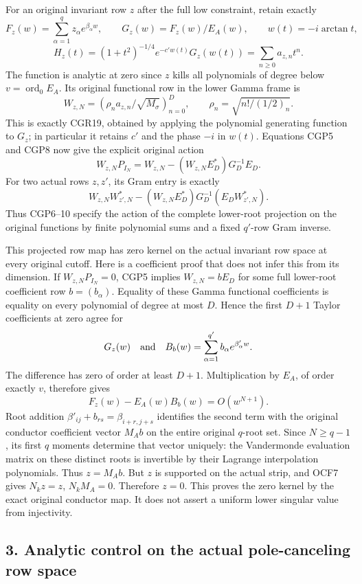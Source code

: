 For an original invariant row \(z\) after the full low constraint, retain exactly \[
F_z(w)=\sum_{\alpha=1}^{q}z_\alpha e^{\beta_\alpha w},\qquad
G_z(w)=F_z(w)/E_A(w),\qquad
w(t)=-i\arctan t,
\] \[
H_z(t)=(1+t^2)^{-1/4}e^{-c'w(t)}G_z(w(t))
=\sum_{n\ge0}a_{z,n}t^n.
\tag{CGP7}
\] The function is analytic at zero since \(z\) kills all polynomials of degree below \(v=\operatorname{ord}_0E_A\). Its original functional row in the lower Gamma frame is \[
W_{z,N}=(\rho_na_{z,n}/\sqrt{M_\sigma})_{n=0}^D,
\qquad \rho_n=\sqrt{n!/(1/2)_n}.
\tag{CGP8}
\] This is exactly CGR19, obtained by applying the polynomial generating function to \(G_z\); in particular it retains \(c'\) and the phase \(-i\) in \(w(t)\). Equations CGP5 and CGP8 now give the explicit original action \[
\boxed{W_{z,N}P_{I_N}
=W_{z,N}-(W_{z,N}E_D^*)G_D^{-1}E_D.}
\tag{CGP9}
\] For two actual rows \(z,z'\), its Gram entry is exactly \[
W_{z,N}W_{z',N}^*
-(W_{z,N}E_D^*)G_D^{-1}(E_DW_{z',N}^*).
\tag{CGP10}
\] Thus CGP6--10 specify the action of the complete lower-root projection on the original functions by finite polynomial sums and a fixed \(q'\)-row Gram inverse.

This projected row map has zero kernel on the actual invariant row space at every original cutoff. Here is a coefficient proof that does not infer this from its dimension. If \(W_{z,N}P_{I_N}=0\), CGP5 implies \(W_{z,N}=bE_D\) for some full lower-root coefficient row \(b=(b_\alpha)\). Equality of these Gamma functional coefficients is equality on every polynomial of degree at most \(D\). Hence the first \(D+1\) Taylor coefficients at zero agree for \[
G_z(w)\quad\hbox{and}\quad B_b(w)=\sum_{\alpha=1}^{q'}
b_\alpha e^{\beta'_\alpha w}.
\] The difference has zero of order at least \(D+1\). Multiplication by \(E_A\), of order exactly \(v\), therefore gives \[
F_z(w)-E_A(w)B_b(w)=O(w^{N+1}).
\tag{CGP11}
\] Root addition \(\beta'_{ij}+b_{rs}=\beta_{i+r,j+s}\) identifies the second term with the original conductor coefficient vector \(M_Ab\) on the entire original \(q\)-root set. Since \(N\ge q-1\), its first \(q\) moments determine that vector uniquely: the Vandermonde evaluation matrix on these distinct roots is invertible by their Lagrange interpolation polynomials. Thus \(z=M_Ab\). But \(z\) is supported on the actual strip, and OCF7 gives \(N_kz=z\), \(N_kM_A=0\). Therefore \(z=0\). This proves the zero kernel by the exact original conductor map. It does not assert a uniform lower singular value from injectivity.

\subsection{3. Analytic control on the actual pole-canceling row space}\label{analytic-control-on-the-actual-pole-canceling-row-space}

